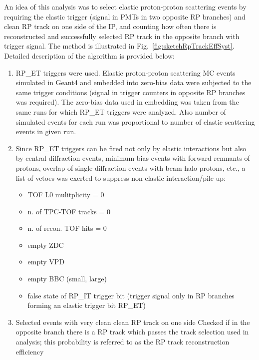 An idea of this analysis was to select elastic proton-proton scattering events by requiring the elastic trigger (signal in PMTs in two opposite RP branches) and clean RP track on one side of the IP, and counting how often there is reconstructed and successfully selected RP track in the opposite branch with trigger signal. The method is illustrated in Fig.~\ref{fig:sketchRpTrackEffSyst}. Detailed description of the algorithm is provided below:
\begin{enumerate}
\item RP\_ET triggers were used. Elastic proton-proton scattering MC events simulated in Geant4 and embedded into zero-bias data were subjected to the same trigger conditions (signal in trigger counters in opposite RP branches was required). The zero-bias data used in embedding was taken from the same runs for which RP\_ET triggers were analyzed. Also number of simulated events for each run was proportional to number of elastic scattering events in given run.
\item Since RP\_ET triggers can be fired not only by elastic interactions but also by central diffraction events, minimum bias events with forward remnants of protons, overlap of single diffraction events with beam halo protons, etc., a list of vetoes was exerted to suppress non-elastic interaction/pile-up:\vspace*{-7pt}
\begin{multicols}{3}
	\begin{itemize}
		\item TOF L0 mulitplicity = 0
		\item n. of TPC-TOF tracks = 0
		\item n. of recon. TOF hits = 0
		\item empty ZDC
		\item empty VPD
		\item empty BBC (small, large)
		\item false state of RP\_IT trigger bit (trigger signal only in RP branches forming an elastic trigger bit RP\_ET)
	\end{itemize}
\end{multicols}
\item
Selected events with very clean clean RP track on one side
Checked if in the opposite branch there is a RP track which passes the track selection used in analysis; this probability is referred to as the RP track reconstruction efficiency
\end{enumerate}


